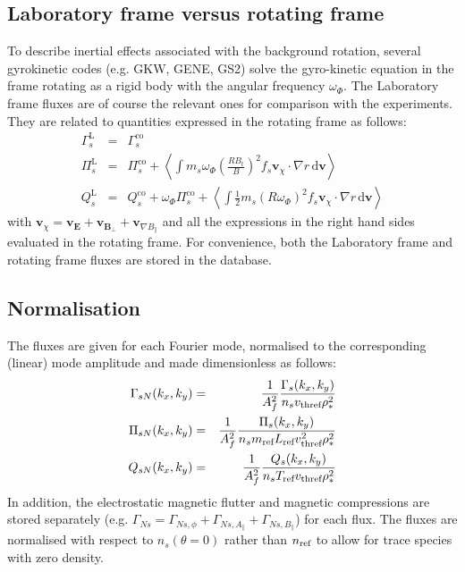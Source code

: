 \documentclass[a4paper]{report}
\begin{document}
\subsection{Laboratory frame versus rotating frame}
To describe inertial effects associated with the background rotation, several gyrokinetic codes (e.g. GKW, GENE, GS2) solve the gyro-kinetic equation in the frame rotating as a rigid body with the angular frequency $\omega_\Phi$. The Laboratory frame fluxes are of course the relevant ones for comparison with the experiments. They are related to quantities expressed in the rotating frame as follows:
\begin{eqnarray}
\Gamma_s^\textrm{L} &=& \Gamma_s^\textrm{co} \\
\Pi_s^\textrm{L} &=& \Pi_s^\textrm{co} + \left< \int m_s\omega_\Phi\left(\frac{RB_t}{B}\right)^2 f_s \mathbf{v}_\chi\cdot \nabla r  \,\textrm{d}\mathbf{v}\right>\\
Q_s^\textrm{L} &=& Q_s^\textrm{co} + \omega_\Phi \Pi_s^\textrm{co}
+ \left< \int \frac{1}{2}m_s(R\omega_\Phi)^2 f_s  \mathbf{v}_\chi\cdot \nabla r \,\textrm{d}\mathbf{v}\right> 
\end{eqnarray}
with $\mathbf{v}_\chi=\mathbf{v}_\mathbf{E} + \mathbf{v}_{\mathbf{B}_\perp}+ \mathbf{v}_{\nabla B_\parallel}$ and all the expressions in the right hand sides evaluated in the rotating frame.
For convenience, both the Laboratory frame and rotating frame fluxes are stored in the database. 


\subsection{Normalisation}
The fluxes are given for each Fourier mode, normalised to the corresponding (linear) mode amplitude and made dimensionless as follows:
\begin{eqnarray}
 \Gamma_{sN}(k_x,k_y) &=& \frac{1}{A_f^2}\frac{\Gamma_s(k_x,k_y)}{n_s v_\textrm{thref} \rho_*^2}\\
 \Pi_{sN}(k_x,k_y) &=& \frac{1}{A_f^2}\frac{\Pi_s(k_x,k_y)}{n_s m_{\textrm{ref}} L_{\textrm{ref}} v_\textrm{thref}^2 \rho_*^2}\\
 Q_{sN}(k_x,k_y) &=& \frac{1}{A_f^2}\frac{Q_s(k_x,k_y)}{n_s T_{\textrm{ref}} v_\textrm{thref} \rho_*^2}
\end{eqnarray}
In addition, the electrostatic magnetic flutter and magnetic compressions are stored separately (e.g. $\Gamma_{Ns}=\Gamma_{Ns,\phi}+\Gamma_{Ns,A_\parallel}+\Gamma_{Ns,B_\parallel}$) for each flux. The fluxes are normalised with respect to $n_s(\theta=0)$ rather than $n_{\textrm{ref}}$ to allow for trace species with zero density.
\end{document}
